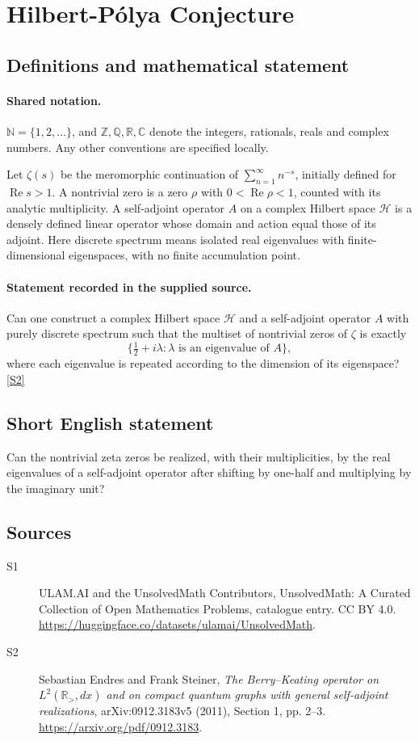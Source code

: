 \documentclass[11pt]{article}
\newcommand{\sref}[2]{\hyperlink{source:#1:#2}{[S#2]}}
\begin{document}
\section{Hilbert-Pólya Conjecture}\label{statement}

\subsection{Definitions and mathematical statement}

\paragraph{Shared notation.}$\mathbb N=\{1,2,\ldots\}$, and $\mathbb Z,\mathbb Q,\mathbb R,\mathbb C$ denote the integers, rationals, reals and complex numbers. Any other conventions are specified locally.


Let $\zeta(s)$ be the meromorphic continuation of $\sum_{n=1}^{\infty}n^{-s}$, initially defined for $\operatorname{Re}s>1$. A nontrivial zero is a zero $\rho$ with $0<\operatorname{Re}\rho<1$, counted with its analytic multiplicity. A self-adjoint operator $A$ on a complex Hilbert space $\mathcal H$ is a densely defined linear operator whose domain and action equal those of its adjoint. Here discrete spectrum means isolated real eigenvalues with finite-dimensional eigenspaces, with no finite accumulation point.
\paragraph{Statement recorded in the supplied source.}
Can one construct a complex Hilbert space $\mathcal H$ and a self-adjoint operator $A$ with purely discrete spectrum such that the multiset of nontrivial zeros of $\zeta$ is exactly
\[
\{\tfrac12+i\lambda:\lambda\text{ is an eigenvalue of }A\},
\]
where each eigenvalue is repeated according to the dimension of its eigenspace? \sref{statement}{2}

\subsection{Short English statement}
Can the nontrivial zeta zeros be realized, with their multiplicities, by the real eigenvalues of a self-adjoint operator after shifting by one-half and multiplying by the imaginary unit?
\subsection{Sources}
\begin{description}
\item[\hypertarget{source:statement:1}{S1}] ULAM.AI and the UnsolvedMath Contributors, UnsolvedMath: A Curated Collection of Open Mathematics Problems, catalogue entry. CC BY 4.0. \url{https://huggingface.co/datasets/ulamai/UnsolvedMath}.
\item[\hypertarget{source:statement:2}{S2}] Sebastian Endres and Frank Steiner, \emph{The Berry--Keating operator on $L^2(\mathbb R_{>},dx)$ and on compact quantum graphs with general self-adjoint realizations}, arXiv:0912.3183v5 (2011), Section 1, pp. 2--3. \url{https://arxiv.org/pdf/0912.3183}.
\end{description}
\label{end:statement}
\end{document}
